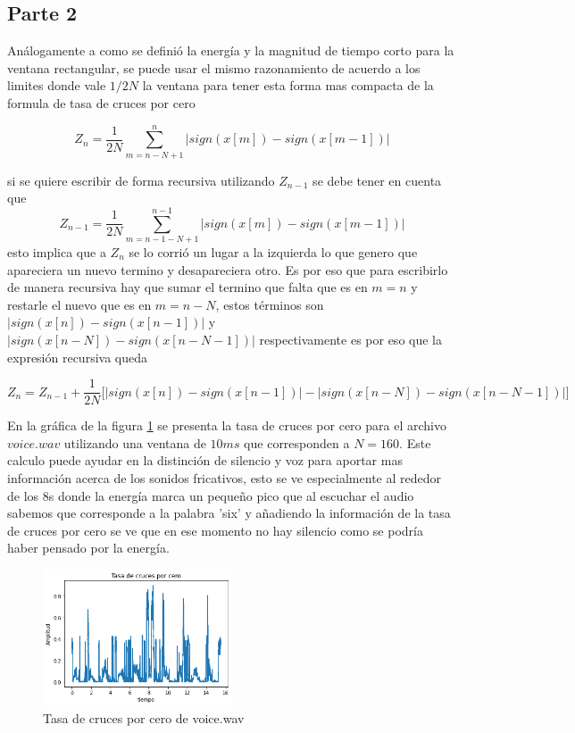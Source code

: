 \documentclass[a4paper]{article}
\begin{document}
\newline
\subsection{Parte 2}
Análogamente a como se definió la energía y la magnitud de tiempo corto para la ventana rectangular, se puede usar el mismo razonamiento de acuerdo a los limites donde vale $1/2N$ la ventana para tener esta forma mas compacta de la formula de tasa de cruces por cero

$$
Z_n = \frac{1}{2N}\sum_{m=n-N+1}^{n} |sign(x[m])-sign(x[m-1])|
$$

si se quiere escribir de forma recursiva utilizando $Z_{n-1}$  se debe tener en cuenta que 
$$
Z_{n-1} = \frac{1}{2N}\sum_{m=n-1-N+1}^{n-1} |sign(x[m])-sign(x[m-1])|
$$
esto implica que a $Z_n$ se lo corrió un lugar a la izquierda lo que genero que apareciera un nuevo termino y desapareciera otro. Es por eso que para escribirlo de manera recursiva hay que sumar el termino que falta que es en $m =  n$ y restarle el nuevo que es en $m = n-N$, estos términos son $|sign(x[n])-sign(x[n-1])|$ y $|sign(x[n-N])-sign(x[n-N-1])|$  respectivamente es por eso que la expresión recursiva queda

$$
Z_n = Z_{n-1} +\frac{1}{2N}\big[|sign(x[n])-sign(x[n-1])| - |sign(x[n-N])-sign(x[n-N-1])|\big]
$$

\newline
En la gráfica de la figura \ref{cero} se presenta la tasa de cruces por cero para el archivo $voice.wav$ utilizando una ventana de $10ms$ que corresponden a $N = 160$. Este calculo puede ayudar en la distinción de silencio y voz para aportar mas información acerca de los sonidos fricativos, esto se ve especialmente al rededor de los 8s donde la energía marca un pequeño pico que al escuchar el audio sabemos que corresponde a la palabra 'six' y añadiendo la información de la tasa de cruces por cero se ve que en ese momento no hay silencio como se podría haber pensado por la energía. 
\begin{figure}[h]
\centering
\includegraphics[width=0.5\textwidth]{cero.png}
\caption{Tasa de cruces por cero de voice.wav}
\label{cero}
\end{figure}
\end{document}
